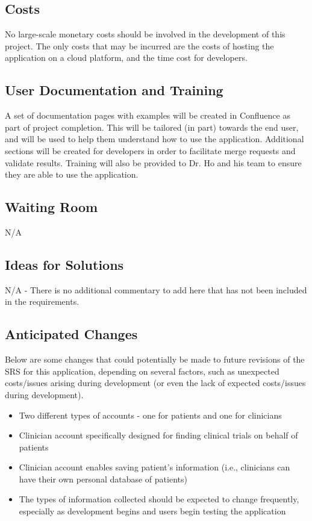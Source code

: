\documentclass[12pt, titlepage]{article}
\begin{document}
\subsection{Costs}
No large-scale monetary costs should be involved in the development of this project. 
The only costs that may be incurred are the costs of hosting the application on a cloud platform, 
and the time cost for developers.
\subsection{User Documentation and Training}
A set of documentation pages with examples will be created in Confluence as part of project completion.
This will be tailored (in part) towards the end user, and will be used to help 
them understand how to use the application. 
Additional sections will be created for developers in order to facilitate merge requests and validate results.
Training will also be provided to Dr. Ho and his team to ensure they are able to use the application.
\subsection{Waiting Room}

N/A

\subsection{Ideas for Solutions}
N/A - There is no additional commentary to add here that has not been included in the requirements.
\subsection{Anticipated Changes}

Below are some changes that could potentially be made to future 
revisions of the SRS for this application, depending on several factors,
such as unexpected costs/issues arising during development (or even the lack 
of expected costs/issues during development).

\begin{itemize}
    \item Two different types of accounts - one for patients and one for clinicians
    \item Clinician account specifically designed for finding clinical trials on behalf of patients
    \item Clinician account enables saving patient's information (i.e., clinicians can have their own personal database of patients)
    \item The types of information collected should be expected to change frequently, especially as development begins and users begin testing the application
\end{itemize}
\end{document}
